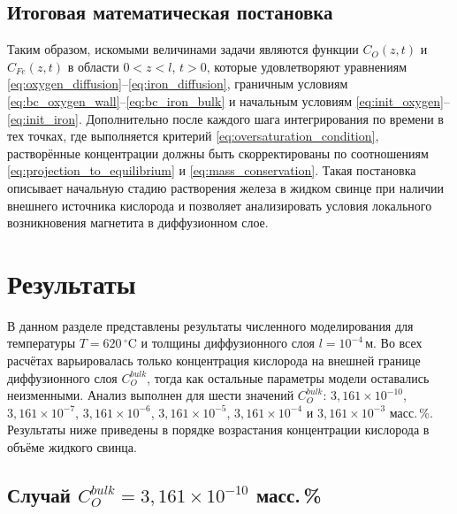 \documentclass[12pt, a4paper]{article}
\begin{document}
\subsection*{Итоговая математическая постановка}

Таким образом, искомыми величинами задачи являются функции $C_O(z,t)$ и $C_{Fe}(z,t)$ в области $0<z<l$, $t>0$, которые удовлетворяют уравнениям \eqref{eq:oxygen_diffusion}--\eqref{eq:iron_diffusion}, граничным условиям \eqref{eq:bc_oxygen_wall}--\eqref{eq:bc_iron_bulk} и начальным условиям \eqref{eq:init_oxygen}--\eqref{eq:init_iron}. Дополнительно после каждого шага интегрирования по времени в тех точках, где выполняется критерий \eqref{eq:oversaturation_condition}, растворённые концентрации должны быть скорректированы по соотношениям \eqref{eq:projection_to_equilibrium} и \eqref{eq:mass_conservation}. Такая постановка описывает начальную стадию растворения железа в жидком свинце при наличии внешнего источника кислорода и позволяет анализировать условия локального возникновения магнетита в диффузионном слое.

\section{Результаты}
\label{sec:results}

В данном разделе представлены результаты численного моделирования для температуры $T=620\,^\circ\mathrm{C}$ и толщины диффузионного слоя $l=10^{-4}\,\mathrm{м}$. Во всех расчётах варьировалась только концентрация кислорода на внешней границе диффузионного слоя $C_O^{bulk}$, тогда как остальные параметры модели оставались неизменными. Анализ выполнен для шести значений $C_O^{bulk}$: $3{,}161\times 10^{-10}$, $3{,}161\times 10^{-7}$, $3{,}161\times 10^{-6}$, $3{,}161\times 10^{-5}$, $3{,}161\times 10^{-4}$ и $3{,}161\times 10^{-3}$ масс.\,\%. Результаты ниже приведены в порядке возрастания концентрации кислорода в объёме жидкого свинца.

\subsection*{Случай $C_O^{bulk}=3{,}161\times 10^{-10}$ масс.\,\%}
\end{document}
